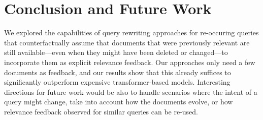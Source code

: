 \section{Conclusion and Future Work}

We explored the capabilities of query rewriting approaches for re-occuring queries that counterfactually assume that documents that were previously relevant are still available---even when they might have been deleted or changed---to incorporate them as explicit relevance feedback. Our approaches only need a few documents as feedback, and our results show that this already suffices to significantly outperform expensive transformer-based models. Interesting directions for future work would be also to handle scenarios where the intent of a query might change, take into account how the documents evolve, or how relevance feedback observed for similar queries can be re-used.